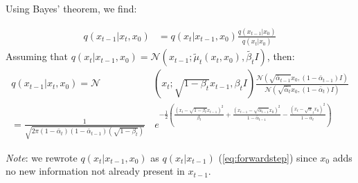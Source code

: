 \documentclass[twoside]{article}
\numberwithin{equation}{section}
\numberwithin{figure}{section}
\begin{document}
Using Bayes' theorem, we find:

\begin{align}
  q\left(x_{t-1} | x_t, x_0\right) &= q\left(x_t | x_{t-1}, x_0\right) \frac{q\left(x_{t-1}| x_0\right)}{q\left(x_t | x_0\right)} \label{eq:ddpmbayes}
\end{align}
  Assuming that $q\left(x_t | x_{t-1}, x_0\right) = \mathcal{N}\left(x_{t-1}; \tilde{\mu}_t \left(x_t, x_0\right), \tilde{\beta_t} I\right)$, then:
\begin{align}
  q\left(x_{t-1} | x_t, x_0\right) = \mathcal{N} & \left(x_t; \sqrt{1 - \beta_t}x_{t-1}, \beta_t I\right) \frac{\mathcal{N}\left(\sqrt{\bar{\alpha}_{t-1}} x_0, \left(1 - \bar{\alpha}_{t-1}\right)I\right)}{\mathcal{N}\left(\sqrt{\bar{\alpha}_t} x_0, \left(1 - \bar{\alpha}_t\right)I\right)} \\[15pt]
  = \frac{1}{\sqrt{2 \pi \left(1 - \bar{\alpha}_t\right) \left(1 - \bar{\alpha}_{t-1}\right) \left(\sqrt{1 - \beta_t}\right)}} & \, e^{- \frac{1}{2} \left(\frac{\left(x_t - \sqrt{1 - \beta_t}x_{t-1}\right)^2}{\beta_t} + \frac{\left(x_{t-1} - \sqrt{\bar{\alpha}_{t-1}}x_0\right)^2}{1 - \bar{\alpha}_{t-1}} - \frac{\left(x_t - \sqrt{\alpha}_t x_0\right)^2}{1 - \bar{\alpha}_{t}}\right)} \label{eq:bayeseq}
\end{align}

\textit{Note}: we rewrote $q\left(x_t | x_{t-1}, x_0\right)$ as $q\left(x_t | x_{t-1}\right)$ (\ref{eq:forwardstep}) since $x_0$ adds no new information not already \indent \indent present in $x_{t-1}$.
\end{document}
